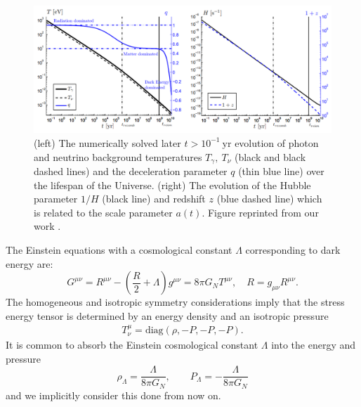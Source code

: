 \documentclass[universe,article,submit,moreauthors,pdftex,a4paper]{Definitions/mdpi}
\newcommand{\beqn}{\begin{equation}}
\newcommand{\eeqn}{\end{equation}}
\begin{document}
\begin{figure}[h]
  \centering
  \includegraphics[width=\linewidth]{./deceleration_evolution}
  \caption{ (left) The numerically solved later $t>10^{-1}\ \mathrm{yr}$ evolution of photon and neutrino background temperatures $T_{\gamma},\ T_{\nu}$ (black and black dashed lines) and the deceleration parameter $q$ (thin blue line) over the lifespan of the Universe. (right) The evolution of the Hubble parameter $1/H$ (black line) and redshift $z$ (blue dashed line) which is related to the scale parameter $a(t)$. Figure reprinted from our work \cite{Rafelski:2013yka}.}
  \label{deceleration_evolution} 
\end{figure}

The Einstein equations with a cosmological constant $\Lambda$ corresponding to dark energy are:
\beqn\label{Einstine}
G^{\mu\nu}=R^{\mu\nu}-\left(\frac R 2 +\Lambda\right) g^{\mu\nu}=8\pi G_N T^{\mu\nu},  
\quad R= g_{\mu\nu}R^{\mu\nu}.
\eeqn
The homogeneous and isotropic symmetry considerations imply that the stress energy tensor is determined by an energy density and an isotropic pressure
\begin{align}
 T^\mu_\nu =\mathrm{diag}(\rho, -P, -P, -P).
\end{align}
It is common to absorb the Einstein cosmological constant $\Lambda$ into the energy and pressure
\beqn\label{EpsLam}
\rho_\Lambda=\frac{\Lambda}{8\pi G_N}, \qquad P_\Lambda=-\frac{\Lambda}{8\pi G_N}
\eeqn
and we implicitly consider this done from now on.
\end{document}

